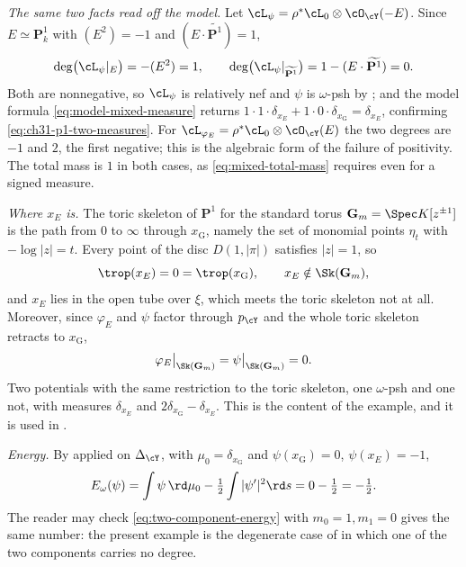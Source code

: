 \begin{example}
\emph{The same two facts read off the model.}  Let
\(\cL_\psi=\rho^*\cL_0\otimes\cO_{\cY}(-E)\).  Since \(E\simeq\mathbf P^1_k\)
with \((E^2)=-1\) and \((E\cdot\widetilde{\mathbf P^1})=1\),
\[
 \deg\bigl(\cL_\psi|_E\bigr)=-(E^2)=1,
 \qquad
 \deg\bigl(\cL_\psi|_{\widetilde{\mathbf P^1}}\bigr)
  =1-(E\cdot\widetilde{\mathbf P^1})=0 .
\]
Both are nonnegative, so \(\cL_\psi\) is relatively nef and \(\psi\) is
\(\omega\)-psh by ; and the model formula
\eqref{eq:model-mixed-measure} returns
\(1\cdot1\cdot\delta_{x_E}+1\cdot0\cdot\delta_{x_{\mathrm G}}=\delta_{x_E}\),
confirming \eqref{eq:ch31-p1-two-measures}.  For \(\cL_{\varphi_E}
=\rho^*\cL_0\otimes\cO_{\cY}(E)\) the two degrees are \(-1\) and \(2\), the
first negative; this is the algebraic form of the failure of positivity.
The total mass is \(1\) in both cases, as \eqref{eq:mixed-total-mass}
requires even for a signed measure.

\emph{Where \(x_E\) is.}  The toric skeleton of \(\mathbf P^1\) for the
standard torus \(\mathbf G_m=\Spec K[z^{\pm1}]\) is the path from \(0\) to
\(\infty\) through \(x_{\mathrm G}\), namely the set of monomial points
\(\eta_t\) with \(-\log|z|=t\).  Every point of the disc \(D(1,|\pi|)\)
satisfies \(|z|=1\), so
\begin{equation}
\label{eq:ch31-p1-trop-collapse}
 \trop(x_E)=0=\trop(x_{\mathrm G}),
 \qquad x_E\notin\Sk(\mathbf G_m),
\end{equation}
and \(x_E\) lies in the open tube over \(\xi\), which meets the toric
skeleton not at all.  Moreover, since \(\varphi_E\) and \(\psi\) factor
through \(p_{\cY}\) and the whole toric skeleton retracts to
\(x_{\mathrm G}\),
\begin{equation}
\label{eq:ch31-p1-restrictions-agree}
 \varphi_E\big|_{\Sk(\mathbf G_m)}
 =\psi\big|_{\Sk(\mathbf G_m)}=0 .
\end{equation}
Two potentials with the same restriction to the toric skeleton, one
\(\omega\)-psh and one not, with measures \(\delta_{x_E}\) and
\(2\delta_{x_{\mathrm G}}-\delta_{x_E}\).  This is the content of the
example, and it is used in .

\emph{Energy.}  By  applied on
\(\Delta_{\cY}\), with \(\mu_0=\delta_{x_{\mathrm G}}\) and
\(\psi(x_{\mathrm G})=0\), \(\psi(x_E)=-1\),
\[
 E_\omega(\psi)=\int\psi\,\rd\mu_0-\tfrac12\int|\psi'|^2\rd s
 =0-\tfrac12=-\tfrac12 .
\]
The reader may check \eqref{eq:two-component-energy} with
\(m_0=1,m_1=0\) gives the same number: the present example is the
degenerate case of  in which one of the two
components carries no degree.
\end{example}

